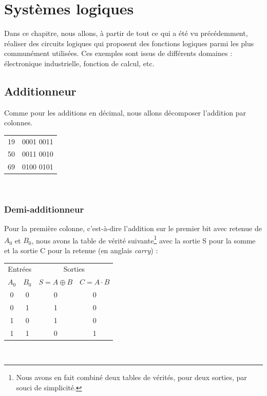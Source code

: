\documentclass{book}
\theoremstyle{definition}
\theoremstyle{definition}
\begin{document}
\chapter{Systèmes logiques}
Dans ce chapitre, nous allons, à partir de tout ce qui a été vu précédemment, réaliser des circuits logiques qui proposent des fonctions logiques parmi les plus communément utilisées. Ces exemples sont issus de différents domaines : électronique industrielle, fonction de calcul, etc.

\section{Additionneur}
Comme pour les additions en décimal, nous allons décomposer l'addition par colonnes.
\\

\begin{tabular}{ c|c }
 19 & 0001 0011 \\
 50 & 0011 0010 \\
 \hline
 69 & 0100 0101 \\
\end{tabular}
\\

\subsection{Demi-additionneur}
Pour la première colonne, c'est-à-dire l'addition sur le premier bit avec retenue de $A_0$ et $B_0$, nous avons la table de vérité suivante\footnote{Nous avons en fait combiné deux tables de vérités, pour deux sorties, par souci de simplicité.} avec la sortie S pour la somme et la sortie C pour la retenue (en anglais \textit{carry}) :
\\

  \begin{tabular}{|c|c||c|c|}
    \hline
         \multicolumn{2}{|c||}{Entrées}& \multicolumn{2}{c|}{Sorties}\\
        
        $A_0$ & $B_0$ & $S=A\oplus B$ & $C=A\cdot B$ \\
    \hline 
        0 & 0 & 0 & 0\\
        0 & 1 & 1 & 0\\
        1 & 0 & 1 & 0\\
        1 & 1 & 0 & 1\\
    \hline
  \end{tabular}
\\
\end{document}
